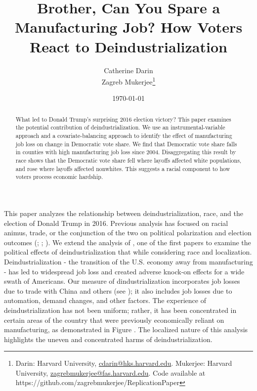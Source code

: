 \documentclass[]{AEA}
\begin{document}
\title{Brother, Can You Spare a Manufacturing Job? How Voters React to
Deindustrialization}


\author{
  Catherine Darin\\
  Zagreb Mukerjee\thanks{
  Darin: Harvard University, \href{mailto:cdarin@hks.harvard.edu}{cdarin@hks.harvard.edu}.
  Mukerjee: Harvard University, \href{mailto:zagrebmukerjee@fas.harvard.edu}{zagrebmukerjee@fas.harvard.edu}.
  Code available at https://github.com/zagrebmukerjee/ReplicationPaper
}
}

\date{\today}
\pubVolume{}
\pubIssue{}
\JEL{}
\Keywords{}

\begin{abstract}
What led to Donald Trump's surprising 2016 election victory? This paper
examines the potential contribution of deindustrialization. We use an
instrumental-variable approach and a covariate-balancing approach to
identify the effect of manufacturing job loss on change in Democratic
vote share. We find that Democratic vote share falls in counties with
high manufacturing job loss since 2004. Disaggregating this result by
race shows that the Democratic vote share fell where layoffs affected
white populations, and rose where layoffs affected nonwhites. This
suggests a racial component to how voters process economic hardship.
\end{abstract}


\maketitle

This paper analyzes the relationship between deindustrialization, race,
and the election of Donald Trump in 2016. Previous analysis has focused
on racial animus, trade, or the conjunction of the two on political
polarization and election outcomes (\cite{Autor20}; \cite{Che16};
\cite{BR21}). We extend the analysis of \cite{Baccini21}, one of the
first papers to examine the political effects of deindustrialization
that while considering race and localization. Deindustrialization - the
transition of the U.S. economy away from manufacturing - has led to
widespread job loss and created adverse knock-on effects for a wide
swath of Americans. Our measure of dindustrialization incorporates job
losses due to trade with China and others (see \cite{Acemoglu16}); it
also includes job losses due to automation, demand changes, and other
factors. The experience of deindustrialization has not been uniform;
rather, it has been concentrated in certain areas of the country that
were previously economically reliant on manufacturing, as demonstrated
in Figure \label{ManuMap}. The localized nature of this analysis
highlights the uneven and concentrated harms of deindustrialization.
\end{document}
